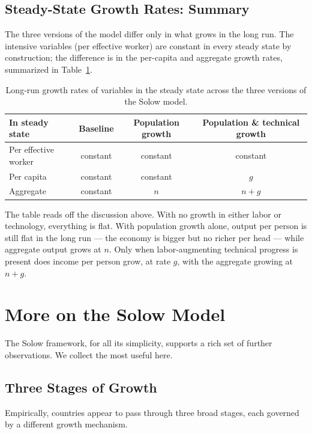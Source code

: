 \subsection{Steady-State Growth Rates: Summary}

The three versions of the model differ only in what grows in the long run. The intensive variables (per effective worker) are constant in every steady state by construction; the difference is in the per-capita and aggregate growth rates, summarized in Table~\ref{tab:solow-summary}.

\begin{table}[h]
\centering
\caption{Long-run growth rates of variables in the steady state across the three versions of the Solow model.}
\label{tab:solow-summary}
\begin{tabular}{@{}lccc@{}}
\toprule
In steady state & Baseline & Population growth & Population \& technical growth \\
\midrule
Per effective worker & constant & constant & constant \\
Per capita & constant & constant & $g$ \\
Aggregate & constant & $n$ & $n + g$ \\
\bottomrule
\end{tabular}
\end{table}

The table reads off the discussion above. With no growth in either labor or technology, everything is flat. With population growth alone, output per person is still flat in the long run --- the economy is bigger but no richer per head --- while aggregate output grows at $n$. Only when labor-augmenting technical progress is present does income per person grow, at rate $g$, with the aggregate growing at $n + g$.

\section{More on the Solow Model}

The Solow framework, for all its simplicity, supports a rich set of further observations. We collect the most useful here.

\subsection{Three Stages of Growth}

Empirically, countries appear to pass through three broad stages, each governed by a different growth mechanism.

